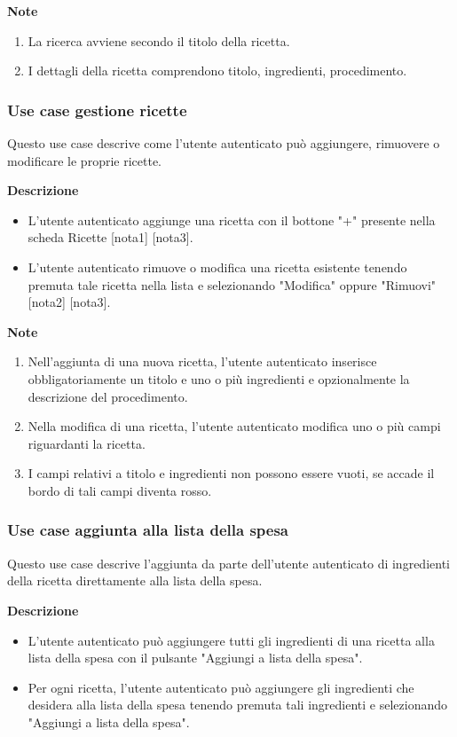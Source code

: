 \documentclass[a4paper,12pt]{article}
\begin{document}
\textbf{Note}
\begin{enumerate} \setlength\itemsep{0.01em}
\item La ricerca avviene secondo il titolo della ricetta.
\item I dettagli della ricetta comprendono titolo, ingredienti, procedimento.
\end{enumerate}

\subsubsection*{Use case gestione ricette}

Questo use case descrive come l'utente autenticato può aggiungere, rimuovere o modificare le proprie ricette.

\textbf{Descrizione}
\begin{itemize} \setlength\itemsep{0.01em}
\item L'utente autenticato aggiunge una ricetta con il bottone "+" presente nella scheda Ricette [nota1] [nota3].
\item L'utente autenticato rimuove o modifica una ricetta esistente tenendo premuta tale ricetta nella lista e selezionando "Modifica" oppure "Rimuovi" [nota2] [nota3].
\end{itemize}

\textbf{Note}
\begin{enumerate} \setlength\itemsep{0.01em}
\item Nell'aggiunta di una nuova ricetta, l'utente autenticato inserisce obbligatoriamente un titolo e uno o più ingredienti e opzionalmente la descrizione del procedimento.
\item Nella modifica di una ricetta, l'utente autenticato modifica uno o più campi riguardanti la ricetta.
\item I campi relativi a titolo e ingredienti non possono essere vuoti, se accade il bordo di tali campi diventa rosso.
\end{enumerate}

\subsubsection*{Use case aggiunta alla lista della spesa}

 Questo use case descrive l'aggiunta da parte dell'utente autenticato di ingredienti della ricetta direttamente alla lista della spesa.
 
\textbf{Descrizione}
\begin{itemize} \setlength\itemsep{0.01em}
\item L'utente autenticato può aggiungere tutti gli ingredienti di una ricetta alla lista della spesa con il pulsante "Aggiungi a lista della spesa".
\item Per ogni ricetta, l'utente autenticato può aggiungere gli ingredienti che desidera alla lista della spesa tenendo premuta tali ingredienti e selezionando "Aggiungi a lista della spesa".
\end{itemize}
\end{document}
